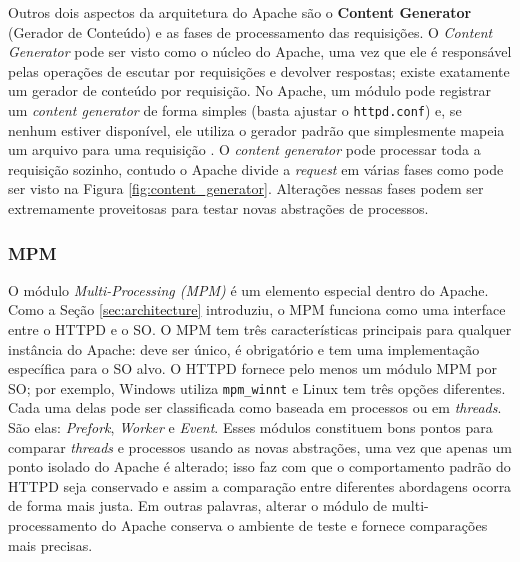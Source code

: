 Outros dois aspectos da arquitetura do Apache são o \textbf{Content Generator}
(Gerador de Conteúdo) e as fases de processamento das requisições. O
\emph{Content Generator} pode ser visto como o núcleo do Apache, uma vez que
ele é responsável pelas operações de escutar por requisições e devolver
respostas; existe exatamente um gerador de conteúdo por requisição. No Apache,
um módulo pode registrar um \emph{content generator} de forma simples (basta
ajustar o \texttt{httpd.conf}) e, se nenhum estiver disponível, ele utiliza
o gerador padrão que simplesmente mapeia um arquivo para uma requisição
\citep{apache_module_book}. O \emph{content generator} pode processar toda a
requisição sozinho, contudo o Apache divide a \emph{request} em várias fases
como pode ser visto na Figura \ref{fig:content_generator}. Alterações nessas
fases podem ser extremamente proveitosas para testar novas abstrações de
processos.

\subsubsection{MPM}
\label{sec:prefork}

O módulo \emph{Multi-Processing (MPM)} é um elemento especial dentro do Apache.
Como a Seção \ref{sec:architecture} introduziu, o MPM funciona como uma
interface entre o HTTPD e o SO. O MPM tem três características principais para
qualquer instância do Apache: deve ser único, é obrigatório e tem uma
implementação específica para o SO alvo. O HTTPD fornece pelo menos um módulo
MPM por SO; por exemplo, Windows utiliza \texttt{mpm\_winnt} e Linux tem três
opções diferentes. Cada uma delas pode ser classificada como baseada em
processos ou em \emph{threads}. São elas: \emph{Prefork}, \emph{Worker} e
\emph{Event}. Esses módulos constituem bons pontos para comparar \emph{threads}
e processos usando as novas abstrações, uma vez que apenas um ponto isolado do
Apache é alterado; isso faz com que o comportamento padrão do HTTPD seja
conservado e assim a comparação entre diferentes abordagens ocorra de forma
mais justa. Em outras palavras, alterar o módulo de multi-processamento do
Apache conserva o ambiente de teste e fornece comparações mais precisas.

